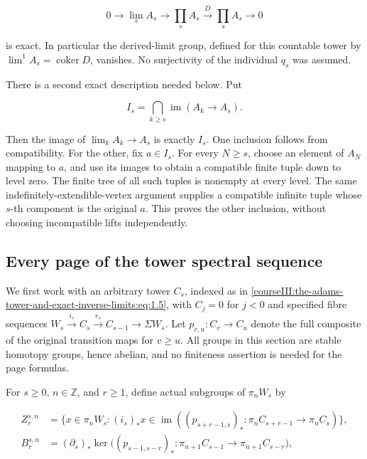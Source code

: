 \begin{equation}
0\longrightarrow\lim_s A_s\longrightarrow\prod_s A_s
   \xrightarrow{D}\prod_s A_s\longrightarrow0
 \label{courseIII:the-adams-tower-and-exact-inverse-limits:eq:2.2}
\end{equation}

is exact. In particular the derived-limit group, defined for this countable tower by \(\lim^1 A_s=\operatorname{coker}D\), vanishes. No surjectivity of the individual \(q_s\) was assumed.

There is a second exact description needed below. Put

\begin{equation}
I_s=\bigcap_{k\geq s}\operatorname{im}(A_k\longrightarrow A_s).
 \label{courseIII:the-adams-tower-and-exact-inverse-limits:eq:2.3}
\end{equation}

Then the image of \(\lim_kA_k\to A_s\) is exactly \(I_s\). One inclusion follows from compatibility. For the other, fix \(a\in I_s\). For every \(N\geq s\), choose an element of \(A_N\) mapping to \(a\), and use its images to obtain a compatible finite tuple down to level zero. The finite tree of all such tuples is nonempty at every level. The same indefinitely-extendible-vertex argument supplies a compatible infinite tuple whose \(s\)-th component is the original \(a\). This proves the other inclusion, without choosing incompatible lifts independently.

\subsection{Every page of the tower spectral sequence}
\label{courseIII:the-adams-tower-and-exact-inverse-limits:section-3}

\label{courseIII:adams-tower:3}

We first work with an arbitrary tower \(C_s\), indexed as in \eqref{courseIII:the-adams-tower-and-exact-inverse-limits:eq:1.5}, with \(C_j=0\) for \(j<0\) and specified fibre sequences
\(W_s\xrightarrow{i_s}C_s\xrightarrow{r_s}C_{s-1}\to\Sigma W_s\).
Let \(p_{v,u}:C_v\to C_u\) denote the full composite of the original transition maps for \(v\geq u\). All groups in this section are stable homotopy groups, hence abelian, and no finiteness assertion is needed for the page formulas.

For \(s\geq0\), \(n\in\mathbb Z\), and \(r\geq1\), define actual subgroups of \(\pi_nW_s\) by

\begin{equation}
\begin{aligned}
 Z_r^{s,n}
 &=\{x\in\pi_nW_s:(i_s)_*x\in
       \operatorname{im}((p_{s+r-1,s})_*:\pi_nC_{s+r-1}\to\pi_nC_s)\},\\
 B_r^{s,n}
 &=(\partial_s)_*\ker\bigl((p_{s-1,s-r})_*:
             \pi_{n+1}C_{s-1}\to\pi_{n+1}C_{s-r}\bigr),
 \end{aligned}
 \label{courseIII:the-adams-tower-and-exact-inverse-limits:eq:3.1}
\end{equation}

